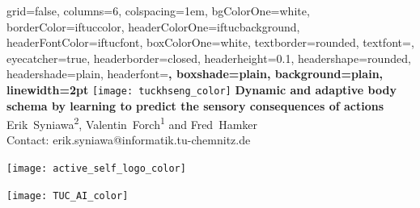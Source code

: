 \documentclass[portrait,final,a0paper,fontscale=0.31]{baposter}
\begin{document}
\begin{poster}%
	{
		grid=false,
		columns=6,
		colspacing=1em,
		bgColorOne=white,
		borderColor=iftuccolor,
		headerColorOne=iftucbackground,
		headerFontColor=iftucfont,
		boxColorOne=white,
		textborder=rounded,
		textfont=\small,
		eyecatcher=true,
		headerborder=closed,
		headerheight=0.1\textheight,
		headershape=rounded,
		headershade=plain,
		headerfont=\Large\bf, %
		boxshade=plain,
		background=plain,
		linewidth=2pt
	}
	{\texttt{[image: tuckhseng\_color]}} 
	{\bf\Large{Dynamic and adaptive body schema by learning to predict the sensory consequences of actions}\vspace{1em}}
	{\large Erik~Syniawa\textsuperscript{2}, Valentin~Forch\textsuperscript{1} and Fred~Hamker \\ \vspace{0.5em}
	\small Contact: erik.syniawa@informatik.tu-chemnitz.de
	}
	{	
		\begin{minipage}[r]{0.1\textwidth}
			\texttt{[image: active\_self\_logo\_color]}
		\end{minipage}
		\hfill
		\begin{minipage}[r]{0.1\textwidth}
			\texttt{[image: TUC\_AI\_color]}
		\end{minipage}
		
	}

\end{poster}
\end{document}
